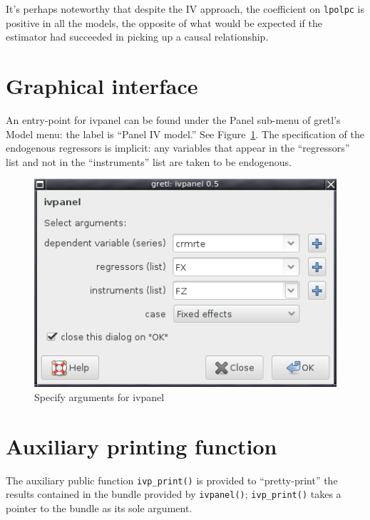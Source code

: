 \documentclass{article}
\begin{document}
It's perhaps noteworthy that despite the IV approach, the coefficient
on \texttt{lpolpc} is positive in all the models, the opposite of what
would be expected if the estimator had succeeded in picking up a
causal relationship.

\section{Graphical interface}

An entry-point for \textsf{ivpanel} can be found under the
\textsf{Panel} sub-menu of gretl's \textsf{Model} menu: the label is
``Panel IV model.'' See Figure~\ref{fig:gui}. The specification of the
endogenous regressors is implicit: any variables that appear in the
``regressors'' list and not in the ``instruments'' list are taken to
be endogenous.

\begin{figure}[htbp]
  \centering
  \includegraphics[scale=0.6]{ivpanel-gui}
  \caption{Specify arguments for ivpanel}
  \label{fig:gui}
\end{figure}

\section{Auxiliary printing function}

The auxiliary public function \texttt{ivp\_print()} is provided to
``pretty-print'' the results contained in the bundle provided by
\texttt{ivpanel()}; \texttt{ivp\_print()} takes a pointer to the
bundle as its sole argument.



\end{document}
